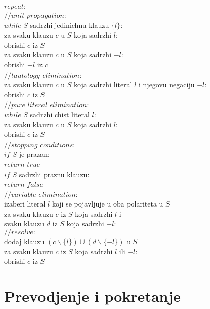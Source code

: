 \documentclass[a4paper,titlepage,12pt]{article}
\begin{document}
\noindent $repeat:$\\
\indent $//unit$ $propagation:$\\
\indent $while$ $S$ sadrzhi jedinichnu klauzu $\{l\}$:\\
\indent \indent za svaku klauzu $c$ u $S$ koja sadrzhi $l$:\\
\indent \indent \indent obrishi $c$ iz $S$\\
\indent \indent za svaku klauzu $c$ u $S$ koja sadrzhi $-l$:\\
\indent \indent \indent obrishi $-l$ iz $c$\\
\indent $//tautology$ $elimination:$\\
\indent za svaku klauzu $c$ u $S$ koja sadrzhi literal $l$ i njegovu negaciju $-l$:\\
\indent \indent obrishi $c$ iz $S$\\
\indent $//pure$ $literal$ $elimination:$\\
\indent $while$ $S$ sadrzhi chist literal $l$:\\
\indent \indent za svaku klauzu $c$ u $S$ koja sadrzhi $l$:\\
\indent \indent \indent obrishi $c$ iz $S$\\
\indent $//stopping$ $conditions:$\\
\indent $if$ $S$ je prazan:\\
\indent \indent $return$ $true$\\
\indent $if$ $S$ sadrzhi praznu klauzu:\\
\indent \indent $return$ $false$\\
\indent $//variable$ $elimination:$\\
\indent izaberi literal $l$ koji se pojavljuje u oba polariteta u $S$\\
\indent \indent za svaku klauzu $c$ iz $S$ koja sadrzhi $l$ i\\
\indent \indent svaku klauzu $d$ iz $S$ koja sadrzhi $-l$:\\
\indent \indent \indent $//resolve:$\\
\indent \indent \indent dodaj klauzu $(c \backslash \{l\}) \cup (d \backslash \{-l\})$ u $S$\\
\indent \indent za svaku klauzu $c$ iz $S$ koja sadrzhi $l$ ili $-l$:\\
\indent \indent \indent obrishi $c$ iz $S$

\section{Prevodjenje i pokretanje}
\end{document}
